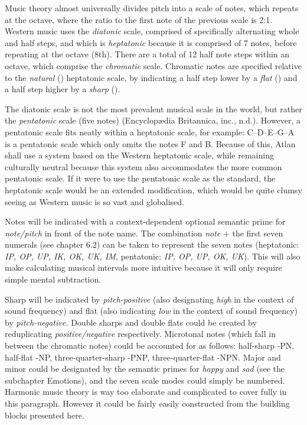 \noindent Music theory almost universally divides pitch into a scale of notes, which repeats at the octave, where the ratio to the first note of the previous scale is 2:1. Western music uses the \textit{diatonic} scale, comprised of specifically alternating whole and half steps, and which is \textit{heptatonic} because it is comprised of 7 notes, before repeating at the octave (8th). There are a total of 12 half note steps within an octave, which comprise the \textit{chromatic} scale. Chromatic notes are specified relative to the \textit{natural} (\natural) heptatonic scale, by indicating a half step lower by a \textit{flat} (\flat) and a half step higher by a \textit{sharp}  (\sharp). 



The diatonic scale is not the most prevalent musical scale in the world,  but rather the \textit{pentatonic} scale (five notes) (Encyclop\ae dia Britannica, inc., n.d.). However, a pentatonic scale fits neatly within a heptatonic scale, for example: C–D–E–G–A is a pentatonic scale which only omits the notes F and B. Because of this, Atlan shall use a system based on the Western heptatonic scale, while remaining culturally neutral because this system also accommodates the more common pentatonic scale. If it were to use the pentatonic scale as the standard, the heptatonic scale would be an extended modification, which would be quite clumsy seeing as Western music is so vast and globalised. 

Notes will be indicated with a context-dependent optional semantic prime for \textit{note/pitch} in front of the note name. The combination {\it note} + the first seven numerals (see chapter 6.2) can be taken to represent the seven notes (heptatonic: \textit{IP, OP, UP, IK, OK, UK, IM,} pentatonic: \textit{IP, OP, UP, OK, UK}). This will also make calculating musical intervals more intuitive because it will only require simple mental subtraction. 

Sharp will be indicated by \textit{pitch-positive} (also designating \textit{high} in the context of sound frequency) and flat (also indicating \textit{low} in the context of sound frequency) by \textit{pitch-negative.} Double sharps and double flats could be created by reduplicating \textit{positive/negative} respectively. Microtonal notes (which fall in between the chromatic notes) could be accounted for as follows: half-sharp -PN, half-flat -NP, three-quarter-sharp  -PNP, three-quarter-flat -NPN. Major and minor could be designated by the semantic primes for \textit{happy} and \textit{sad} (see the subchapter Emotions), and the seven scale modes could simply be numbered. Harmonic music theory is way too elaborate and complicated to cover fully in this paragraph. However it could be fairly easily constructed from the building blocks presented here. 

